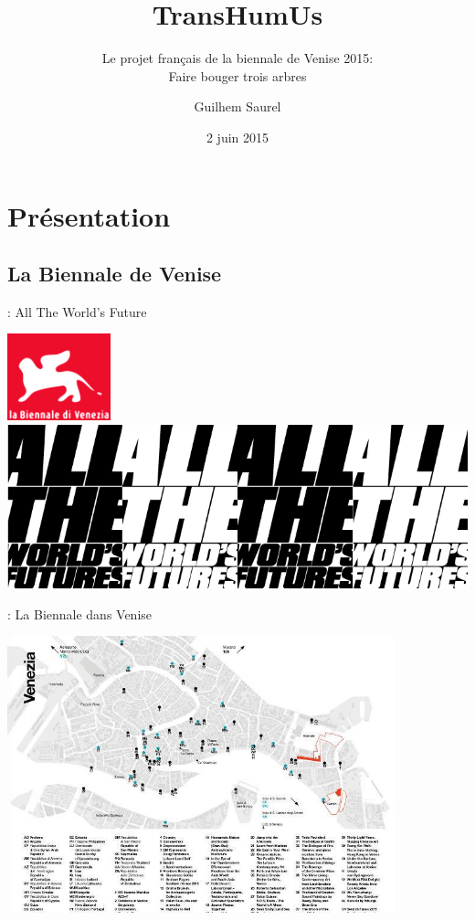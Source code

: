 \documentclass[12pt]{beamer}
\title{TransHumUs}
\subtitle{Le projet français de la biennale de Venise 2015: \\Faire bouger trois arbres}
\author{Guilhem Saurel}
\institute{Gepetto}
\date{2 juin 2015}
\begin{document}
    {\canvasspecial
    \begin{frame}
    \titlepage
    \end{frame}}

    \section{Présentation}
        \subsection{La Biennale de Venise}
            \begin{frame}{\subsecname: All The World’s Future}
                \begin{center}
                    \includegraphics[width=3cm]{img/lion.jpg} \\
                    \includegraphics[width=\linewidth]{img/ATWF4.png}
                \end{center}
            \end{frame}
            \begin{frame}{\subsecname: La Biennale dans Venise}
                \vspace{-0.4cm}
                \begin{center}
                    \includegraphics[height=8cm]{img/venise.jpg}
                \end{center}
            \end{frame}
\end{document}
